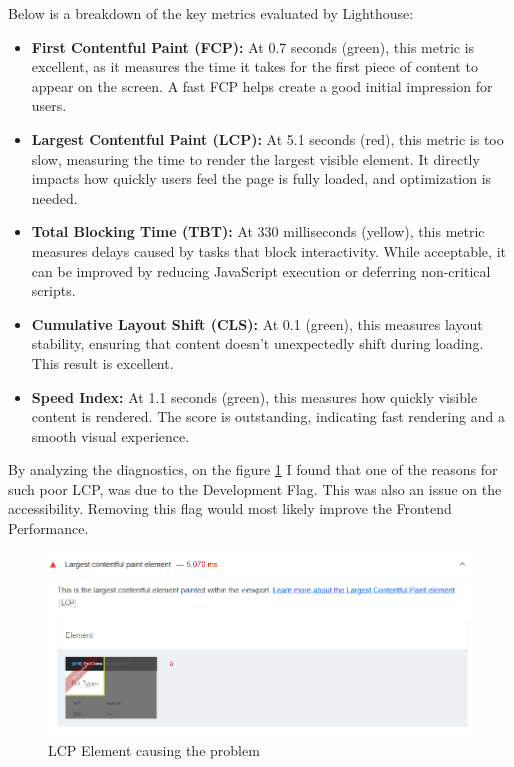 \documentclass[a4paper,11pt,openright,BCOR=15mm]{scrbook}
\begin{document}
Below is a breakdown of the key metrics evaluated by Lighthouse:
\begin{itemize}
    \item \textbf{First Contentful Paint (FCP):} At 0.7 seconds (green), this metric is excellent, as it measures the time it takes for the first piece of content to appear on the screen. A fast FCP helps create a good initial impression for users.

    \item \textbf{Largest Contentful Paint (LCP):} At 5.1 seconds (red), this metric is too slow, measuring the time to render the largest visible element. It directly impacts how quickly users feel the page is fully loaded, and optimization is needed.

    \item \textbf{Total Blocking Time (TBT):} At 330 milliseconds (yellow), this metric measures delays caused by tasks that block interactivity. While acceptable, it can be improved by reducing JavaScript execution or deferring non-critical scripts.

    \item \textbf{Cumulative Layout Shift (CLS):} At 0.1 (green), this measures layout stability, ensuring that content doesn’t unexpectedly shift during loading. This result is excellent.

    \item \textbf{Speed Index:} At 1.1 seconds (green), this measures how quickly visible content is rendered. The score is outstanding, indicating fast rendering and a smooth visual experience.
\end{itemize}

By analyzing the diagnostics, on the figure \ref{fig:LCP} I found that one of the reasons for such poor LCP, was due to the Development Flag. This was also an issue on the accessibility. Removing this flag would most likely improve the Frontend Performance.

\begin{figure}[H]
	\centering
	\includegraphics[width=.7\textwidth]{figs/Performance/Frontend/LCP Problem.png}
	\caption{LCP Element causing the problem}
	\label{fig:LCP}
\end{figure}
\end{document}
